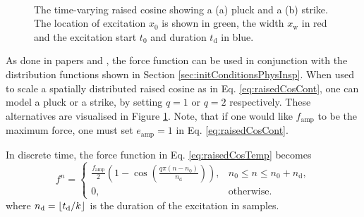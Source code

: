 \begin{figure}[t]
    \centering
    \\
    \hfill
    \caption{The time-varying raised cosine showing a (a) pluck and a (b) strike. The location of excitation $x_0$ is shown in green, the width $x_\text{w}$ in red and the excitation start $t_0$ and duration $t_\text{d}$ in blue.\label{fig:timeVaryingRaisedCos}}
\end{figure}

As done in papers \citeP[A] and \citeP[B], the force function can be used in conjunction with the distribution functions shown in Section \ref{sec:initConditionsPhysInsp}. When used to scale a spatially distributed raised cosine as in Eq. \eqref{eq:raisedCosCont}, one can model a pluck or a strike, by setting $q=1$ or $q=2$ respectively. These alternatives are visualised in Figure \ref{fig:timeVaryingRaisedCos}. Note, that if one would like $f_\text{amp}$ to be the maximum force, one must set $e_\text{amp} = 1$ in Eq. \eqref{eq:raisedCosCont}. 

In discrete time, the force function in Eq. \eqref{eq:raisedCosTemp} becomes
\begin{equation}\label{eq:discExcitation}
    f^n = 
    \begin{cases}
        \frac{f_\text{amp}}{2}\left(1-\cos\left(\frac{q\pi (n - n_0)}{n_\text{d}}\right)\right), & n_0 \leq n \leq n_0+n_\text{d},\\
        0, &\text{otherwise}.
    \end{cases}
\end{equation}
where $n_\text{d} = \floor[t_\text{d}/k]$ is the duration of the excitation in samples.

